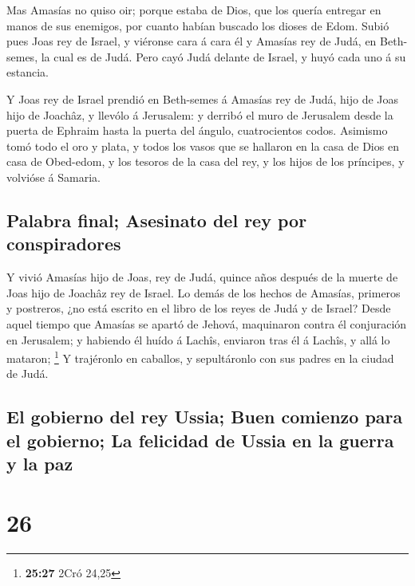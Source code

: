  Mas Amasías no quiso oir; porque estaba de Dios, que los
quería entregar en manos de sus enemigos, por cuanto habían buscado los
dioses de Edom.  Subió pues Joas rey de Israel, y
viéronse cara á cara él y Amasías rey de Judá, en Beth-semes, la cual es
de Judá.  Pero cayó Judá delante de Israel, y huyó cada
uno á su estancia.

 Y Joas rey de Israel prendió en Beth-semes á Amasías rey
de Judá, hijo de Joas hijo de Joachâz, y llevólo á Jerusalem: y derribó
el muro de Jerusalem desde la puerta de Ephraim hasta la puerta del
ángulo, cuatrocientos codos.  Asimismo tomó todo el oro y
plata, y todos los vasos que se hallaron en la casa de Dios en casa de
Obed-edom, y los tesoros de la casa del rey, y los hijos de los
príncipes, y volvióse á Samaria.

\hypertarget{palabra-final-asesinato-del-rey-por-conspiradores}{%
\subsection{Palabra final; Asesinato del rey por
conspiradores}\label{palabra-final-asesinato-del-rey-por-conspiradores}}

 Y vivió Amasías hijo de Joas, rey de Judá, quince años
después de la muerte de Joas hijo de Joachâz rey de Israel.
 Lo demás de los hechos de Amasías, primeros y postreros,
¿no está escrito en el libro de los reyes de Judá y de Israel?
 Desde aquel tiempo que Amasías se apartó de Jehová,
maquinaron contra él conjuración en Jerusalem; y habiendo él huído á
Lachîs, enviaron tras él á Lachîs, y allá lo mataron; \footnote{\textbf{25:27}
  2Cró 24,25}  Y trajéronlo en caballos, y sepultáronlo
con sus padres en la ciudad de Judá.

\hypertarget{el-gobierno-del-rey-ussia-buen-comienzo-para-el-gobierno-la-felicidad-de-ussia-en-la-guerra-y-la-paz}{%
\subsection{El gobierno del rey Ussia; Buen comienzo para el gobierno;
La felicidad de Ussia en la guerra y la
paz}\label{el-gobierno-del-rey-ussia-buen-comienzo-para-el-gobierno-la-felicidad-de-ussia-en-la-guerra-y-la-paz}}

\hypertarget{section-25}{%
\section{26}\label{section-25}}

